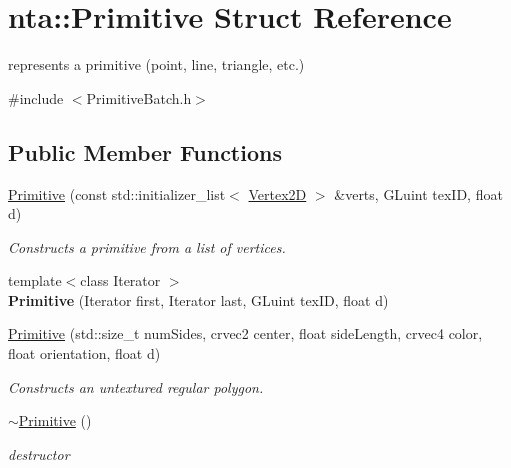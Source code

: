 \hypertarget{structnta_1_1Primitive}{}\section{nta\+:\+:Primitive Struct Reference}
\label{structnta_1_1Primitive}


represents a primitive (point, line, triangle, etc.)  




{\ttfamily \#include $<$Primitive\+Batch.\+h$>$}

\subsection*{Public Member Functions}
\begin{DoxyCompactItemize}
\item 
\mbox{\label{structnta_1_1Primitive_ad8eb45115ed7647d71360ce6366eb2bc}} 
\hyperlink{structnta_1_1Primitive_ad8eb45115ed7647d71360ce6366eb2bc}{Primitive} (const std\+::initializer\+\_\+list$<$ \hyperlink{structnta_1_1Vertex2D}{Vertex2D} $>$ \&verts, G\+Luint tex\+ID, float d)
\begin{DoxyCompactList}\small\item\em Constructs a primitive from a list of vertices. \end{DoxyCompactList}\item 
\mbox{\label{structnta_1_1Primitive_aa0325b0eb7dc6ec40294b9e47feb750b}} 
{\footnotesize template$<$class Iterator $>$ }\\{\bfseries Primitive} (Iterator first, Iterator last, G\+Luint tex\+ID, float d)
\item 
\mbox{\label{structnta_1_1Primitive_aecce4a7f13b72766aed56ca66760b43d}} 
\hyperlink{structnta_1_1Primitive_aecce4a7f13b72766aed56ca66760b43d}{Primitive} (std\+::size\+\_\+t num\+Sides, crvec2 center, float side\+Length, crvec4 color, float orientation, float d)
\begin{DoxyCompactList}\small\item\em Constructs an untextured regular polygon. \end{DoxyCompactList}\item 
\mbox{\label{structnta_1_1Primitive_a39fbab541466b58744a8c7a0aa4eb49c}} 
\hyperlink{structnta_1_1Primitive_a39fbab541466b58744a8c7a0aa4eb49c}{$\sim$\+Primitive} ()
\begin{DoxyCompactList}\small\item\em destructor \end{DoxyCompactList}\end{DoxyCompactItemize}

